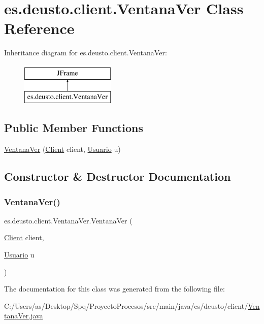 \hypertarget{classes_1_1deusto_1_1client_1_1_ventana_ver}{}\section{es.\+deusto.\+client.\+Ventana\+Ver Class Reference}
\label{classes_1_1deusto_1_1client_1_1_ventana_ver}
Inheritance diagram for es.\+deusto.\+client.\+Ventana\+Ver\+:\begin{figure}[H]
\begin{center}
\leavevmode
\includegraphics[height=2.000000cm]{classes_1_1deusto_1_1client_1_1_ventana_ver}
\end{center}
\end{figure}
\subsection*{Public Member Functions}
\begin{DoxyCompactItemize}
\item 
\mbox{\hyperlink{classes_1_1deusto_1_1client_1_1_ventana_ver_ac53c302eabef4830a1c0fa0831e3cff8}{Ventana\+Ver}} (\mbox{\hyperlink{classes_1_1deusto_1_1client_1_1_client}{Client}} client, \mbox{\hyperlink{classes_1_1deusto_1_1server_1_1jdo_1_1_usuario}{Usuario}} u)
\end{DoxyCompactItemize}


\subsection{Constructor \& Destructor Documentation}
\mbox{\label{classes_1_1deusto_1_1client_1_1_ventana_ver_ac53c302eabef4830a1c0fa0831e3cff8}} 
\subsubsection{\texorpdfstring{VentanaVer()}{VentanaVer()}}
{\footnotesize\ttfamily es.\+deusto.\+client.\+Ventana\+Ver.\+Ventana\+Ver (\begin{DoxyParamCaption}\item[{\mbox{\hyperlink{classes_1_1deusto_1_1client_1_1_client}{Client}}}]{client,  }\item[{\mbox{\hyperlink{classes_1_1deusto_1_1server_1_1jdo_1_1_usuario}{Usuario}}}]{u }\end{DoxyParamCaption})}



The documentation for this class was generated from the following file\+:\begin{DoxyCompactItemize}
\item 
C\+:/\+Users/as/\+Desktop/\+Spq/\+Proyecto\+Procesos/src/main/java/es/deusto/client/\mbox{\hyperlink{_ventana_ver_8java}{Ventana\+Ver.\+java}}\end{DoxyCompactItemize}
